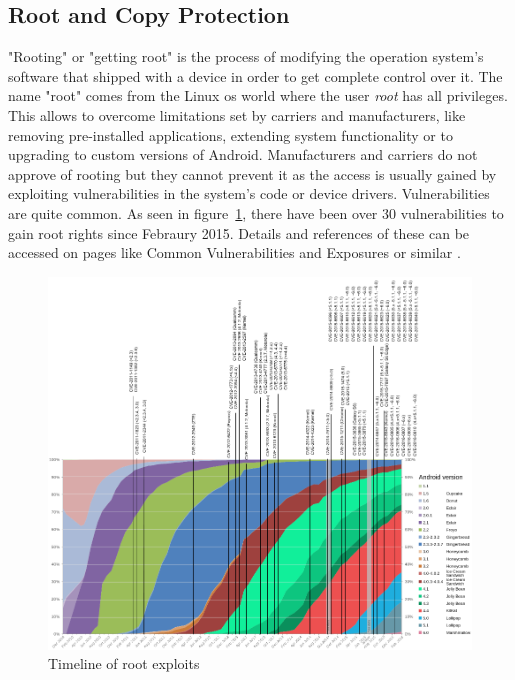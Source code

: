 \subsection{Root and Copy Protection} \label{subsection:android-copyroot}
"Rooting" or "getting root" is the process of modifying the operation system's software that shipped with a device in order to get complete control over it.
The name "root" comes from the Linux \gls{os} world where the user \textit{root} has all privileges.
This allows to overcome limitations set by carriers and manufacturers, like removing pre-installed applications, extending system functionality or to upgrading to custom versions of Android.
Manufacturers and carriers do not approve of rooting but they cannot prevent it as the access is usually gained by exploiting vulnerabilities in the system's code or device drivers.
Vulnerabilities are quite common.
As seen in figure~\ref{fig:root}, there have been over 30 vulnerabilities to gain root rights since Febraury 2015.
Details and references of these can be accessed on pages like Common Vulnerabilities and Exposures or similar \cite{cveAndroidPriv} \cite{cveDetails}.
\newline
\begin{figure}[h]
    \centering
    \includegraphics[width=1\textwidth]{data/timeline.png}
    \caption{Timeline of root exploits \cite{distributionRoot} \cite{androidVulnerabilities} \cite{cveAndroidPriv} \cite{cveDetails}}
    \label{fig:root}
\end{figure}
